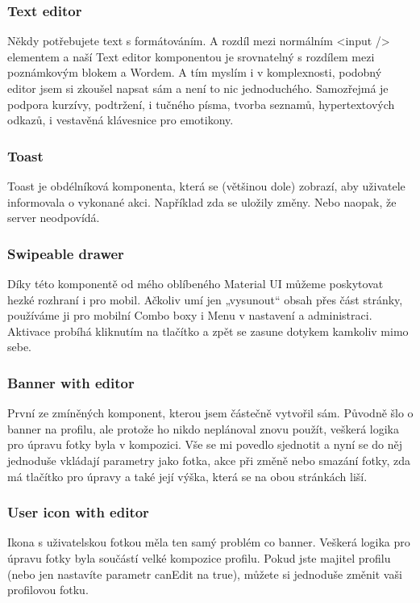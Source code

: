 \subsubsection{Text editor}
Někdy potřebujete text s formátováním. A rozdíl mezi normálním <input /> elementem a naší Text editor komponentou je srovnatelný s rozdílem mezi poznámkovým blokem a Wordem. A tím myslím i v komplexnosti, podobný editor jsem si zkoušel napsat sám a není to nic jednoduchého. Samozřejmá je podpora kurzívy, podtržení, i tučného písma, tvorba seznamů, hypertextových odkazů, i vestavěná klávesnice pro emotikony.

\subsubsection{Toast}
Toast je obdélníková komponenta, která se (většinou dole) zobrazí, aby uživatele informovala o vykonané akci. Například zda se uložily změny. Nebo naopak, že server neodpovídá.

\subsubsection{Swipeable drawer}
Díky této komponentě od mého oblíbeného Material UI můžeme poskytovat hezké rozhraní i pro mobil. Ačkoliv umí jen „vysunout“ obsah přes část stránky, používáme ji pro mobilní Combo boxy i Menu v nastavení a administraci. Aktivace probíhá kliknutím na tlačítko a zpět se zasune dotykem kamkoliv mimo sebe.

\subsubsection{Banner with editor}
První ze zmíněných komponent, kterou jsem částečně vytvořil sám. Původně šlo o banner na profilu, ale protože ho nikdo neplánoval znovu použít, veškerá logika pro úpravu fotky byla v kompozici. Vše se mi povedlo sjednotit a nyní se do něj jednoduše vkládají parametry jako fotka, akce při změně nebo smazání fotky, zda má tlačítko pro úpravy a také její výška, která se na obou stránkách liší.

\subsubsection{User icon with editor}
Ikona s uživatelskou fotkou měla ten samý problém co banner. Veškerá logika pro úpravu fotky byla součástí velké kompozice profilu. Pokud jste majitel profilu (nebo jen nastavíte parametr canEdit na true), můžete si jednoduše změnit vaši profilovou fotku.
